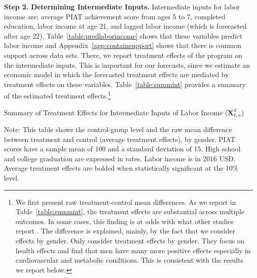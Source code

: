 \begin{figure}
\end{figure}

\noindent \textbf{Step 2. Determining Intermediate Inputs.} Intermediate inputs for labor income are: average PIAT achievement score from ages 5 to 7, completed education, labor income at age 21, and lagged labor income (which is forecasted after age 22). Table~\ref{table:predlaborincome} shows that these variables predict labor income and Appendix~\ref{app:containsupport} shows that there is common support across data sets. There, we report treatment effects of the program on the intermediate inputs. This is important for our forecasts, since we estimate an economic model in which the forecasted treatment effects are mediated by treatment effects on these variables. Table~\ref{table:summint} provides a summary of the estimated treatment effects.\footnote{We first present raw treatment-control mean differences. As we report in Table~\ref{table:summint}, the treatment effects are substantial across multiple outcomes. In some cases, this finding is at odds with what other studies report \citep{Ramey_etal_1985_Project-CARE_TiECSE,Clarke_Campbell_1998_ABC_Comparison_ECRQ,Campbell_Pungello_etal_2001_DP,Campbell_Ramey_etal_2002_ADS,Campbell_Wasik_etal_2008_ECRQ,Campbell_Conti_etal_2014_EarlyChildhoodInvestments}. The difference is explained, mainly, by the fact that we consider effects by gender.  Only \citet{Campbell_Conti_etal_2014_EarlyChildhoodInvestments} consider treatment effects by gender. They focus on health effects and find that men have many more positive effects especially in cardiovascular and metabolic conditions. This is consistent with the results we report below.}

\begin{table}[H]
\begin{threeparttable}
\caption{Summary of Treatment Effects for Intermediate Inputs of Labor Income ($\bm{X}^d_{k,a}$)} \label{table:summint}
\centering

\begin{tablenotes}
\footnotesize
\item Note: This table shows the control-group level and the raw mean difference between treatment and control (average treatment effects), by gender. PIAT scores have a sample mean of 100 and a standard deviation of 15. High school and college graduation are expressed in rates. Labor income is in 2016 USD. Average treatment effects are bolded when statistically significant at the 10\% level.
\end{tablenotes}
\end{threeparttable}
\end{table}

